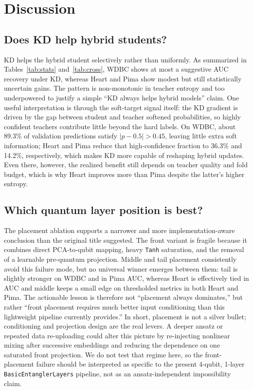 \documentclass[11pt,a4paper]{article}
\begin{document}
\section{Discussion}
\label{sec:disc}

\subsection{Does KD help hybrid students?}
KD helps the hybrid student selectively rather than uniformly. As summarized in
Tables~\ref{tab:stats} and~\ref{tab:cross}, WDBC shows at most a suggestive AUC recovery under KD,
whereas Heart and Pima show modest but still statistically uncertain gains. The pattern is
non-monotonic in teacher entropy and too underpowered to justify a simple ``KD always helps hybrid
models'' claim. One useful interpretation is through the soft-target signal itself: the KD gradient
is driven by the gap between student and teacher softened probabilities, so highly confident
teachers contribute little beyond the hard labels. On WDBC, about 89.3\% of validation predictions
satisfy $|p-0.5|>0.45$, leaving little extra soft information; Heart and Pima reduce that
high-confidence fraction to 36.3\% and 14.2\%, respectively, which makes KD more capable of
reshaping hybrid updates. Even there, however, the realized benefit still depends on teacher quality
and fold budget, which is why Heart improves more than Pima despite the latter's higher entropy.

\subsection{Which quantum layer position is best?}
The placement ablation supports a narrower and more implementation-aware conclusion than the
original title suggested. The front variant is fragile because it combines direct PCA-to-qubit
mapping, heavy \texttt{Tanh} saturation, and the removal of a learnable pre-quantum projection.
Middle and tail placement consistently avoid this failure mode, but no universal winner emerges
between them: tail is slightly stronger on WDBC and in Pima AUC, whereas Heart is effectively tied
in AUC and middle keeps a small edge on thresholded metrics in both Heart and Pima. The actionable lesson is therefore not ``placement
always dominates,'' but rather ``front placement requires much better input conditioning than this
lightweight pipeline currently provides.''
In short, placement is not a silver bullet; conditioning and projection design are the real levers.
A deeper ansatz or repeated data re-uploading could alter this picture by re-injecting nonlinear
mixing after successive embeddings and reducing the dependence on one saturated front projection. We
do not test that regime here, so the front-placement failure should be interpreted as specific to the
present 4-qubit, 1-layer \texttt{BasicEntanglerLayers} pipeline, not as an ansatz-independent
impossibility claim.
\end{document}
